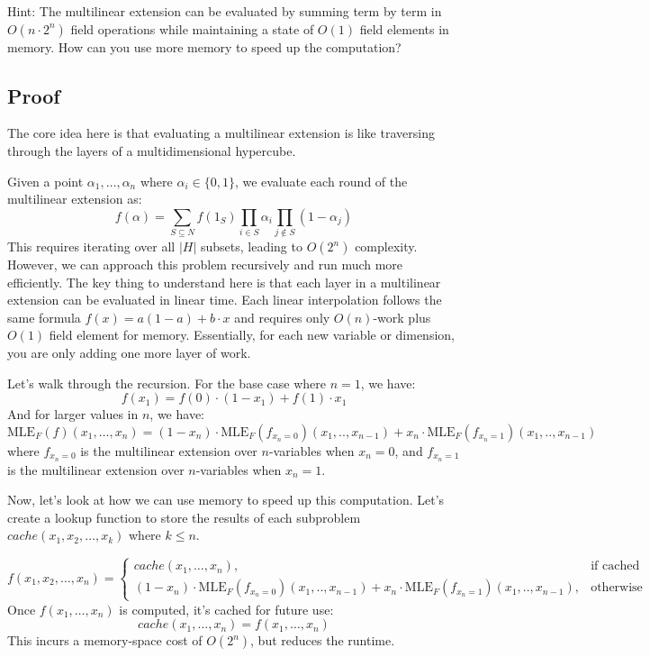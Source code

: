 \documentclass{article}
\begin{document}
Hint: The multilinear extension can be evaluated by summing term by term in $O(n \cdot 2^n)$ field operations while maintaining a state of $O(1)$ field elements in memory. How can you use more memory to speed up the computation?


\subsection{Proof}
The core idea here is that evaluating a multilinear extension is like traversing through the layers of a multidimensional hypercube.

Given a point $\alpha_{1},\dotsc,\alpha_{n}$ where $\alpha_{i} \in \{0,1\}$, we evaluate each round of the multilinear extension as:
\[
f(\alpha) = \sum_{S \subseteq N} f(1_S) \prod_{i \in S} \alpha_i \prod_{j \not\in S} (1 - \alpha_j)
\]
This requires iterating over all $|H|$ subsets, leading to $O(2^{n})$ complexity. However, we can approach this problem recursively and run much more efficiently. The key thing to understand here is that each layer in a multilinear extension can be evaluated in linear time. Each linear interpolation follows the same formula $f(x) = a(1- a) + b\cdot x$ and requires only $O(n)$-work plus $O(1)$ field element for memory. Essentially, for each new variable or dimension, you are only adding one more layer of work.

Let's walk through the recursion. For the base case where $n=1$, we have:
\[
f(x_{1}) = f(0) \cdot (1 - x_{1}) + f(1) \cdot x_{1}
\]
And for larger values in $n$, we have:
\[
  \mathrm{MLE}_F(f)(x_{1},\dotsc,x_{n}) = (1-x_{n}) \cdot \mathrm{MLE}_F(f_{x_{n}=0})(x_{1}, ..,x_{n-1}) + x_{n} \cdot \mathrm{MLE}_F(f_{x_{n}=1}) (x_{1},.., x_{n-1})
\]
where $f_{x_{n}=0}$ is the multilinear extension over $n$-variables when $x_{n}=0$, and $f_{x_{n}=1}$ is the multilinear extension over $n$-variables when $x_{n}=1$.

Now, let's look at how we can use memory to speed up this computation. Let's create a lookup function to store the results of each subproblem $cache(x_{1}, x_{2},\dotsc,x_{k})$ where $k \le n$.

\[
f(x_{1}, x_{2},\dotsc,x_{n}) = \begin{cases}
  cache(x_{1},\dotsc,x_{n}), & \text{if cached} \\
  (1-x_{n}) \cdot \mathrm{MLE}_F(f_{x_{n}=0})(x_{1}, ..,x_{n-1}) + x_{n} \cdot \mathrm{MLE}_F(f_{x_{n}=1}) (x_{1},.., x_{n-1}), & \text{otherwise}
\end{cases}
\]
Once $f(x_{1},\dotsc,x_{n})$ is computed, it's cached for future use:
\[
cache(x_{1},\dotsc,x_{n}) = f(x_{1},\dotsc,x_{n})
\]
This incurs a memory-space cost of $O(2^{n})$, but reduces the runtime.
\end{document}
